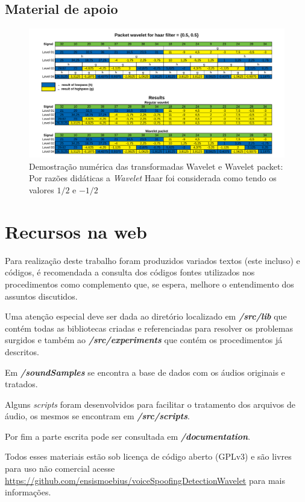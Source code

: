 \begin{apendicesenv}
	\partapendices
	\begin{landscape}
		\chapter{Material de apoio}
		\begin{figure}[h]
			\includegraphics[width=.93\linewidth]{images/haarWaveletExamples.pdf}
			\caption{Demostração numérica das transformadas Wavelet e Wavelet packet: Por razões didáticas a \textit{Wavelet} Haar foi considerada como tendo os valores $1/2$ e $-1/2$}
			\label{fig:haarWaveletExamples}
		\end{figure}
	\end{landscape}
	\chapter{Recursos na web}
		\par Para realização deste trabalho foram produzidos variados textos (este incluso) e códigos, é recomendada a consulta dos códigos fontes utilizados nos procedimentos como complemento que, se espera, melhore o entendimento dos assuntos discutidos.
		
		\par Uma atenção especial deve ser dada ao diretório localizado em \textit{\textbf{/src/lib}} que contém todas as bibliotecas criadas e referenciadas para resolver os problemas surgidos e também ao \textit{\textbf{/src/experiments}} que contém os procedimentos já descritos.
				
		\par Em \textit{\textbf{/soundSamples}} se encontra a base de dados com os áudios originais e tratados.
		
		\par Alguns \textit{scripts} foram desenvolvidos para facilitar o tratamento dos arquivos de áudio, os mesmos se encontram em \textbf{\textit{/src/scripts}}.
		
		\par Por fim a parte escrita pode ser consultada em \textit{\textbf{/documentation}}.
		
		\par Todos esses materiais estão sob licença de código aberto (GPLv3) e são livres para uso não comercial acesse   \href{https://github.com/ensismoebius/voiceSpoofingDetectionWavelet}{https://github.com/ensismoebius/voiceSpoofingDetectionWavelet} para mais informações.
\end{apendicesenv}
